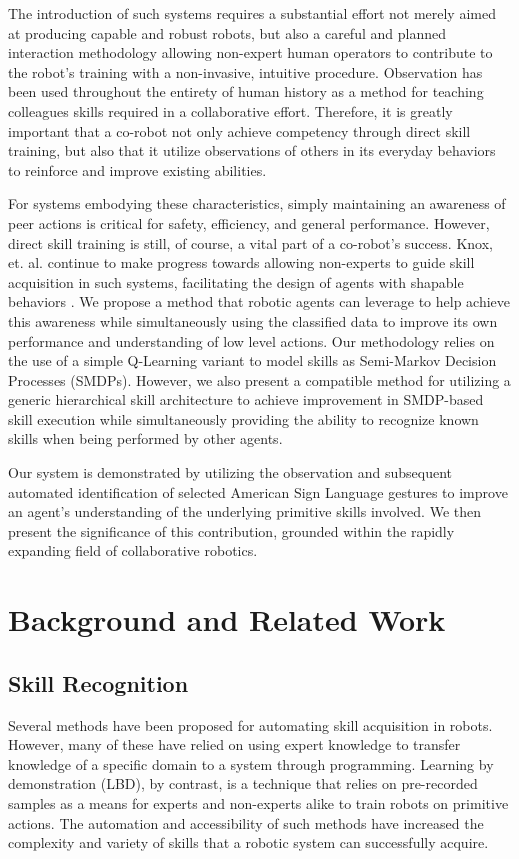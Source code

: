\documentclass[letterpaper]{article}
\begin{document}
  The introduction of such systems requires a substantial effort not merely aimed at producing capable and robust robots, but also a careful and planned interaction methodology allowing non-expert human operators to contribute to the robot's training with a non-invasive, intuitive procedure.  Observation has been used throughout the entirety of human history as a method for teaching colleagues skills required in a collaborative effort.  Therefore, it is greatly important that a co-robot not only achieve competency through direct skill training, but also that it utilize observations of others in its everyday behaviors to reinforce and improve existing abilities.

  For systems embodying these characteristics, simply maintaining an awareness of peer actions is critical for safety, efficiency, and general performance. However, direct skill training is still, of course, a vital part of a co-robot's success.  Knox, et. al. continue to make progress towards allowing non-experts to guide skill acquisition in such systems, facilitating the design of agents with shapable behaviors \cite{TAMER2}. We propose a method that robotic agents can leverage to help achieve this awareness while simultaneously using the classified data to improve its own performance and understanding of low level actions.  Our methodology relies on the use of a simple Q-Learning variant to model skills as Semi-Markov Decision Processes (SMDPs).  However, we also present a compatible method for utilizing a generic hierarchical skill architecture to achieve improvement in SMDP-based skill execution while simultaneously providing the ability to recognize known skills when being performed by other agents. 

Our system is demonstrated by utilizing the observation and subsequent automated identification of selected American Sign Language gestures to improve an agent's understanding of the underlying primitive skills involved. We then present the significance of this contribution, grounded within the rapidly expanding field of collaborative robotics.

\section{Background and Related Work}
\label{sec:background}
\subsection{Skill Recognition}
Several methods have been proposed for automating skill acquisition in robots.  However, many of these have relied on using expert knowledge to transfer knowledge of a specific domain to a system through programming.  Learning by demonstration (LBD), by contrast, is a technique that relies on pre-recorded samples as a means for experts and non-experts alike to train robots on primitive actions.  The automation and accessibility of such methods have increased the complexity and variety of skills that a robotic system can successfully acquire.
\end{document}

